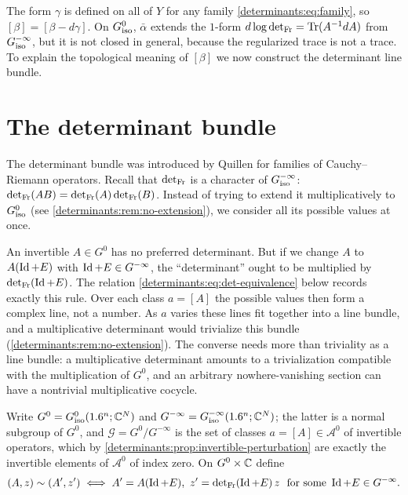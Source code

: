 The form $\gamma$ is defined on all of $Y$ for any family
\eqref{determinants:eq:family}, so $[\beta]=[\beta-d\gamma]$. On $G^{0}_{\mathrm{iso}}$,
$\bar\alpha$ extends the $1$-form $d\log\operatorname{det}_{\mathrm{Fr}}=\operatorname{Tr}(A^{-1}dA)$ from
$G^{-\infty}_{\mathrm{iso}}$, but it is not closed in general, because the regularized
trace is not a trace. To explain the topological meaning of $[\beta]$ we now
construct the determinant line bundle.

\section{The determinant bundle}\label{determinants:sec:det-bundle}

The determinant bundle was introduced by Quillen \cite{Quillen} for families of
Cauchy--Riemann operators. Recall that $\operatorname{det}_{\mathrm{Fr}}$ is a character of
$G^{-\infty}_{\mathrm{iso}}$: $\operatorname{det}_{\mathrm{Fr}}(AB)=\operatorname{det}_{\mathrm{Fr}}(A)\operatorname{det}_{\mathrm{Fr}}(B)$. Instead of trying to extend
it multiplicatively to $G^{0}_{\mathrm{iso}}$ (see \cref{determinants:rem:no-extension}),
we consider all its possible values at once.

\begin{discussion}
An invertible $A\in G^0$ has no preferred determinant. But if we change $A$
to $A(\operatorname{Id}+E)$ with $\operatorname{Id}+E\in G^{-\infty}$, the ``determinant'' ought to be
multiplied by $\operatorname{det}_{\mathrm{Fr}}(\operatorname{Id}+E)$. The relation
\eqref{determinants:eq:det-equivalence} below records exactly this rule.
Over each class $a=[A]$ the possible values then form a complex line, not a
number. As $a$ varies these lines fit together into a line bundle, and a
multiplicative determinant would trivialize this bundle
(\cref{determinants:rem:no-extension}). The converse needs more than
triviality as a line bundle: a multiplicative determinant amounts to a
trivialization compatible with the multiplication of $G^0$, and an arbitrary
nowhere-vanishing section can have a nontrivial multiplicative cocycle.
\end{discussion}

Write
$G^0=G^{0}_{\mathrm{iso}}(1.6^n;\mathbb{C}^N)$ and $G^{-\infty}=G^{-\infty}_{\mathrm{iso}}(1.6^n;\mathbb{C}^N)$; the
latter is a normal subgroup of $G^0$, and $\mathcal G=G^0/G^{-\infty}$ is the
set of classes $a=[A]\in\mathcal A^0$ of invertible operators, which by
\cref{determinants:prop:invertible-perturbation} are exactly the invertible
elements of $\mathcal A^0$ of index zero. On $G^0\times\mathbb{C}$ define
\begin{equation}\label{determinants:eq:det-equivalence}
  (A,z)\sim(A',z')\iff A'=A(\operatorname{Id}+E),\ z'=\operatorname{det}_{\mathrm{Fr}}(\operatorname{Id}+E)\,z\ \text{ for some }\operatorname{Id}+E\in G^{-\infty}.
\end{equation}

